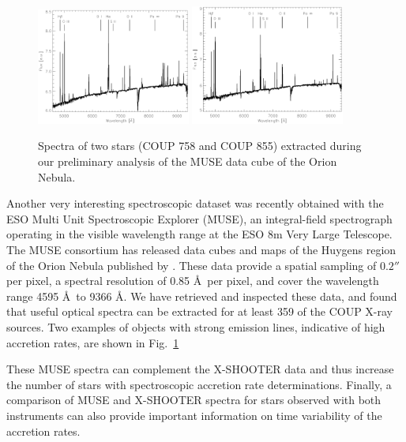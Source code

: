 \documentclass[10pt,fleqn,twoside,a4paper]{article}
\begin{document}
\begin{figure} %
\centering
\includegraphics[width=0.45\textwidth]{plot_COUP_758.ps}
\includegraphics[width=0.45\textwidth]{plot_COUP_855.ps}
\caption{
Spectra of two stars (COUP 758 and COUP 855) extracted during our preliminary analysis
of the MUSE data cube of the Orion Nebula.
\label{muse-spectra.fig}}
\end{figure} %


Another very interesting spectroscopic dataset was recently
obtained with the 
ESO Multi Unit Spectroscopic Explorer (MUSE), 
an integral-field spectrograph operating in the visible wavelength range
at the ESO 8m Very Large Telescope.
%
The MUSE consortium has released 
data cubes and maps of the Huygens region of the Orion Nebula
published by \citep{Weilbacher15}. %
%
These data provide a spatial sampling of $0.2''$ per pixel, 
a spectral resolution of 0.85 \AA \, per pixel, and 
cover the wavelength range 4595 \AA \, to 9366 \AA.
%
We have retrieved and inspected these data, and found that useful
optical spectra can be extracted for at least 359 of the 
COUP X-ray sources.
Two examples of objects with strong emission lines, indicative 
of high accretion rates, are shown in Fig.~\ref{muse-spectra.fig} 

These MUSE spectra can complement the X-SHOOTER data and thus increase 
the number of stars with spectroscopic accretion rate determinations.
Finally, a comparison of MUSE and X-SHOOTER spectra for stars observed
with both instruments can also provide important information 
on time variability of the accretion rates.
\end{document}
